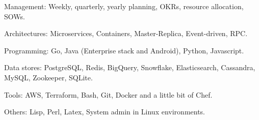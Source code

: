 \begin{rlist}
  \item Management: Weekly, quarterly, yearly planning, OKRs, resource allocation, SOWs.
  \item Architectures: Microservices, Containers, Master-Replica, Event-driven, RPC.
  \item Programming: Go, Java (Enterprise stack and Android), Python, Javascript.
  \item Data stores: PostgreSQL, Redis, BigQuery, Snowflake, Elasticsearch, Cassandra, MySQL, Zookeeper, SQLite.
  \item Tools: AWS, Terraform, Bash, Git, Docker and a little bit of Chef.
  \item Others: Lisp, Perl, Latex, System admin in Linux environments.
\end{rlist}

